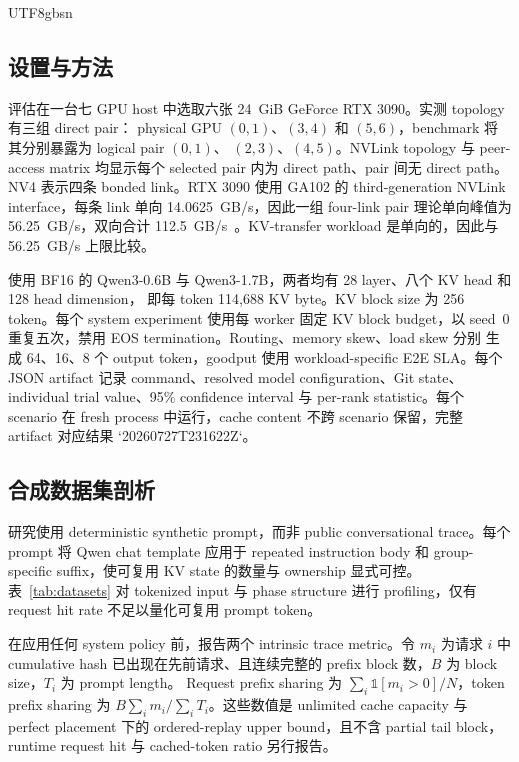\documentclass[11pt,a4paper]{article}
\begin{document}
\begin{CJK*}{UTF8}{gbsn}
\subsection{设置与方法}

评估在一台七 GPU host 中选取六张 24~GiB GeForce RTX 3090。实测 topology 有三组 direct pair：
physical GPU $(0,1)$、$(3,4)$ 和 $(5,6)$，benchmark 将其分别暴露为 logical pair $(0,1)$、
$(2,3)$、$(4,5)$。NVLink topology 与 peer-access matrix 均显示每个 selected pair 内为 direct
path、pair 间无 direct path。NV4 表示四条 bonded link。RTX 3090
使用 GA102 的 third-generation NVLink interface，每条 link 单向 14.0625~GB/s，因此一组 four-link
pair 理论单向峰值为 56.25~GB/s，双向合计 112.5~GB/s~\citep{NVIDIAAmpereGA102}。KV-transfer
workload 是单向的，因此与 56.25~GB/s 上限比较。

使用 BF16 的 Qwen3-0.6B 与 Qwen3-1.7B，两者均有 28 layer、八个 KV head 和 128 head dimension，
即每 token 114,688 KV byte。KV block size 为 256 token。每个 system experiment 使用每 worker 固定
KV block budget，以 seed~0 重复五次，禁用 EOS termination。Routing、memory skew、load skew 分别
生成 64、16、8 个 output token，goodput 使用 workload-specific E2E SLA。每个 JSON artifact 记录
command、resolved model configuration、Git state、individual trial value、95\% confidence interval 与
per-rank statistic。每个 scenario 在 fresh process 中运行，cache content 不跨 scenario 保留，完整
artifact 对应结果 `20260727T231622Z`。

\subsection{合成数据集剖析}

研究使用 deterministic synthetic prompt，而非 public conversational trace。每个 prompt 将 Qwen chat
template 应用于 repeated instruction body 和 group-specific suffix，使可复用 KV state 的数量与 ownership
显式可控。表~\ref{tab:datasets} 对 tokenized input 与 phase structure 进行 profiling，仅有 request
hit rate 不足以量化可复用 prompt token。

在应用任何 system policy 前，报告两个 intrinsic trace metric。令 $m_i$ 为请求 $i$ 中 cumulative
hash 已出现在先前请求、且连续完整的 prefix block 数，$B$ 为 block size，$T_i$ 为 prompt length。
Request prefix sharing 为 $\sum_i\mathbb{1}[m_i>0]/N$，token prefix sharing 为
$B\sum_i m_i/\sum_i T_i$。这些数值是 unlimited cache capacity 与 perfect placement 下的 ordered-replay
upper bound，且不含 partial tail block，runtime request hit 与 cached-token ratio 另行报告。


\end{CJK*}
\end{document}
